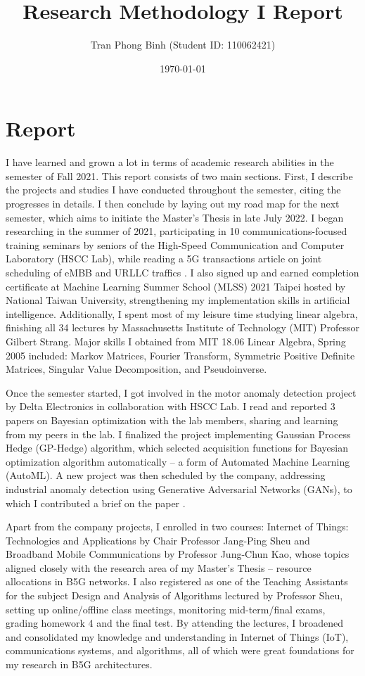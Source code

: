 \documentclass[12pt, a4paper, onside]{article}
\title{\textbf{Research Methodology I Report}}
\author{Tran Phong Binh (Student ID: 110062421)}
\affil{Advisor: Chair Professor Jang-Ping Sheu}
\date{\today}
\begin{document}
\maketitle

\section{Report}
I have learned and grown a lot in terms of academic research abilities in the semester of Fall 2021. This report consists of two main sections. First, I describe the projects and studies I have conducted throughout the semester, citing the progresses in details. I then conclude by laying out my road map for the next semester, which aims to initiate the Master's Thesis in late July 2022.
I began researching in the summer of 2021, participating in 10 communications-focused training seminars by seniors of the High-Speed Communication and Computer Laboratory (HSCC Lab), while reading a 5G transactions article on joint scheduling of eMBB and URLLC traffics \cite{5gJointACM}. I also signed up and earned completion certificate at Machine Learning Summer School (MLSS) 2021 Taipei hosted by National Taiwan University, strengthening my implementation skills in artificial intelligence. Additionally, I spent most of my leisure time studying linear algebra, finishing all 34 lectures by Massachusetts Institute of Technology (MIT) Professor Gilbert Strang. Major skills I obtained from MIT 18.06 Linear Algebra, Spring 2005 included: Markov Matrices, Fourier Transform, Symmetric Positive Definite Matrices, Singular Value Decomposition, and Pseudoinverse.

Once the semester started, I got involved in the motor anomaly detection project by Delta Electronics in collaboration with HSCC Lab. I read and reported 3 papers on Bayesian optimization \cite{bayesPortfolio, bayesSearch, bayesBandit} with the lab members, sharing and learning from my peers in the lab. I finalized the project implementing Gaussian Process Hedge (GP-Hedge) algorithm, which selected acquisition functions for Bayesian optimization algorithm automatically -- a form of Automated Machine Learning (AutoML). A new project was then scheduled by the company, addressing industrial anomaly detection using Generative Adversarial Networks (GANs), to which I contributed a brief on the paper \cite{efficientGAN}.

Apart from the company projects, I enrolled in two courses: Internet of Things: Technologies and Applications by Chair Professor Jang-Ping Sheu and Broadband Mobile Communications by Professor Jung-Chun Kao, whose topics aligned closely with the research area of my Master's Thesis -- resource allocations in B5G networks. I also registered as one of the Teaching Assistants for the subject Design and Analysis of Algorithms lectured by Professor Sheu, setting up online/offline class meetings, monitoring mid-term/final exams, grading homework 4 and the final test. By attending the lectures, I broadened and consolidated my knowledge and understanding in Internet of Things (IoT), communications systems, and algorithms, all of which were great foundations for my research in B5G architectures.
\end{document}

